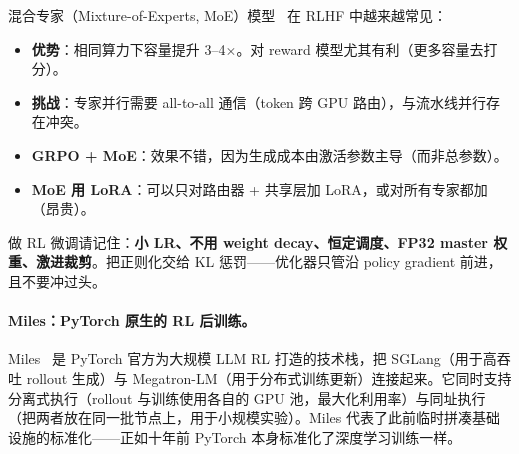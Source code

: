 \begin{intuitionbox}
混合专家（Mixture-of-Experts, MoE）模型~\cite{fedus2022switch} 在 RLHF 中越来越常见：

\begin{itemize}
  \item \textbf{优势}：相同算力下容量提升 3--4$\times$。对 reward 模型尤其有利（更多容量去打分）。
  \item \textbf{挑战}：专家并行需要 all-to-all 通信（token 跨 GPU 路由），与流水线并行存在冲突。
  \item \textbf{GRPO + MoE}：效果不错，因为生成成本由激活参数主导（而非总参数）。
  \item \textbf{MoE 用 LoRA}：可以只对路由器 + 共享层加 LoRA，或对所有专家都加（昂贵）。
\end{itemize}
\end{intuitionbox}

\begin{intuitionbox}[RL 优化器口诀]
做 RL 微调请记住：\textbf{小 LR、不用 weight decay、恒定调度、FP32 master 权重、激进裁剪}。把正则化交给 KL 惩罚——优化器只管沿 policy gradient 前进，且不要冲过头。
\end{intuitionbox}

\paragraph{Miles：PyTorch 原生的 RL 后训练。}
Miles~\cite{miles2026pytorch} 是 PyTorch 官方为大规模 LLM RL 打造的技术栈，把 SGLang（用于高吞吐 rollout 生成）与 Megatron-LM（用于分布式训练更新）连接起来。它同时支持分离式执行（rollout 与训练使用各自的 GPU 池，最大化利用率）与同址执行（把两者放在同一批节点上，用于小规模实验）。Miles 代表了此前临时拼凑基础设施的标准化——正如十年前 PyTorch 本身标准化了深度学习训练一样。

